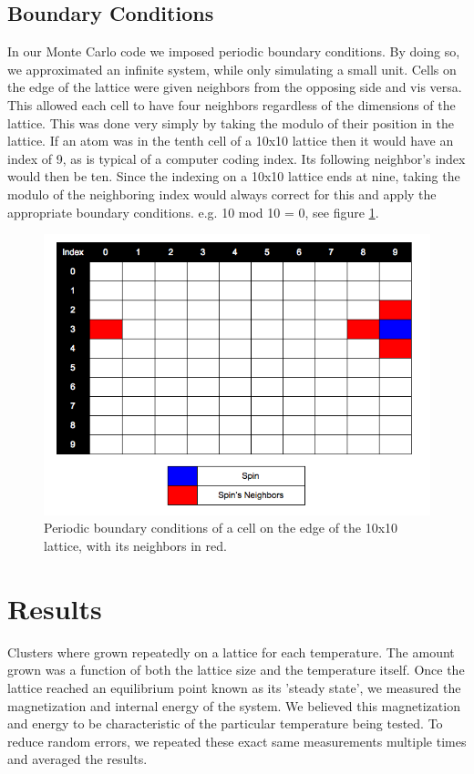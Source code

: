\documentclass[a4paper,twoside,12pt]{article}
\begin{document}
\subsection{Boundary Conditions}
In our Monte Carlo code we imposed periodic boundary conditions. By doing so, we approximated an infinite system, while only simulating a small unit. Cells on the edge of the lattice were given neighbors from the opposing side and vis versa. This allowed each cell to have four neighbors regardless of the dimensions of the lattice.
This was done very simply by taking the modulo of their position in the lattice. If an atom was in the tenth cell of a 10x10 lattice then it would have an index of 9, as is typical of a computer coding index. Its following neighbor's index would then be ten. Since the indexing on a 10x10 lattice ends at nine, taking the modulo of the neighboring index would always correct for this and apply the appropriate boundary conditions. e.g. 10 mod 10 = 0, see figure \ref{fig:periodic_boundary}.

\begin{figure}
\centering
\includegraphics[scale=0.3]{Figures/Lattice_Neighbors.png}
\caption{Periodic boundary conditions of a cell on the edge of the 10x10 lattice, with its neighbors in red.}
\label{fig:periodic_boundary}
\end{figure} 



\section{Results}
Clusters where grown repeatedly on a lattice for each temperature. The amount grown was a function of both the lattice size and the temperature itself. Once the lattice reached an equilibrium point known as its 'steady state', we measured the magnetization and internal energy of the system. We believed this magnetization and energy to be characteristic of the particular temperature being tested. To reduce random errors, we repeated these exact same measurements multiple times and averaged the results.
\end{document}
